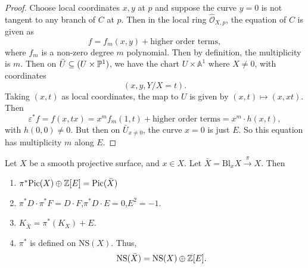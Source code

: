 \documentclass[a4paper]{article}
\newcommand\A{\mathbb{A}}
\newcommand\Pic{\mathrm{Pic}}
\newcommand\NS{\mathrm{NS}}
\newcommand\Bl{\mathrm{Bl}}
\begin{document}
\begin{proof}
  Choose local coordinates $x, y$ at $p$ and suppose the curve $y = 0$ is not tangent to any branch of $C$ at $p$. Then in the local ring $\hat{\mathcal{O}}_{X, p}$, the equation of $C$ is given as
  \[
    f = f_m(x, y) + \text{higher order terms},
  \]
  where $f_m$ is a non-zero degree $m$ polynomial. Then by definition, the multiplicity is $m$. Then on $\bar{U} \subseteq (U \times \P^1)$, we have the chart $U \times \A^1$ where $X \not= 0$, with coordinates
  \[
    (x, y, Y/X = t).
  \]
  Taking $(x, t)$ as local coordinates, the map to $U$ is given by $(x, t) \mapsto (x, xt)$. Then
  \[
    \varepsilon^* f = f(x, tx) = x^m f_m(1, t) + \text{higher order terms} = x^m \cdot h(x, t),
  \]
  with $h(0, 0) \not= 0$. But then on $\bar{U}_{x \not= 0}$, the curve $x = 0$ is just $E$. So this equation has multiplicity $m$ along $E$.
\end{proof}

\begin{prop}
  Let $X$ be a smooth projective surface, and $x \in X$. Let $\bar{X} = \Bl_x X \overset{\pi}{\to} X$. Then
  \begin{enumerate}
    \item $\pi^* \Pic(X) \oplus \Z[E] = \Pic(\bar{X})$
    \item $\pi^*D \cdot \pi^* F = D \cdot F$,\quad $\pi^* D \cdot E = 0$,\quad $E^2 = -1$.
    \item $K_{\bar{X}} = \pi^* (K_X) + E$.
    \item $\pi^*$ is defined on $\NS(X)$. Thus,
      \[
        \NS(\bar{X}) = \NS(X) \oplus \Z [E].
      \]
  \end{enumerate}
\end{prop}
\end{document}
